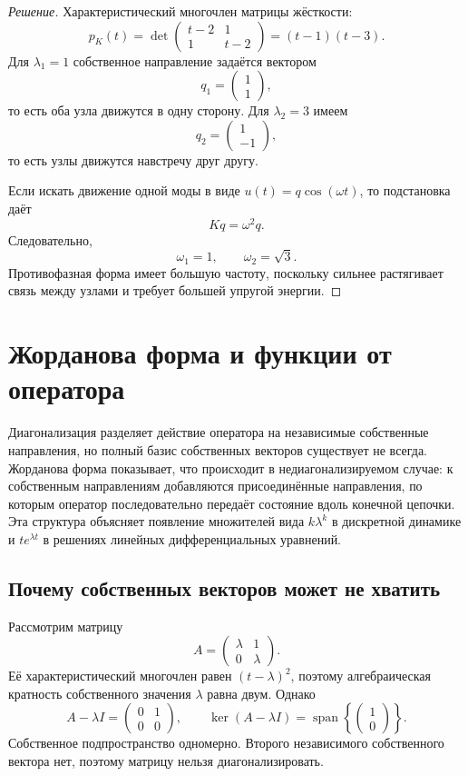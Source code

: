 \begin{proof}[Решение]
Характеристический многочлен матрицы жёсткости:
\[
p_K(t)=
\det
\begin{pmatrix}
t-2&1\\
1&t-2
\end{pmatrix}
=(t-1)(t-3).
\]
Для $\lambda_1=1$ собственное направление задаётся вектором
\[
q_1=
\begin{pmatrix}1\\1\end{pmatrix},
\]
то есть оба узла движутся в одну сторону. Для $\lambda_2=3$ имеем
\[
q_2=
\begin{pmatrix}1\\-1\end{pmatrix},
\]
то есть узлы движутся навстречу друг другу.

Если искать движение одной моды в виде $u(t)=q\cos(\omega t)$, то подстановка даёт
\[
Kq=\omega^2q.
\]
Следовательно,
\[
\omega_1=1,
\qquad
\omega_2=\sqrt3.
\]
Противофазная форма имеет большую частоту, поскольку сильнее растягивает связь между узлами и требует большей упругой энергии.
\end{proof}

\section{Жорданова форма и функции от оператора}
\label{sec:jordan-and-functions}

Диагонализация разделяет действие оператора на независимые собственные направления, но полный базис собственных векторов существует не всегда. Жорданова форма показывает, что происходит в недиагонализируемом случае: к собственным направлениям добавляются присоединённые направления, по которым оператор последовательно передаёт состояние вдоль конечной цепочки. Эта структура объясняет появление множителей вида $k\lambda^k$ в дискретной динамике и $t e^{\lambda t}$ в решениях линейных дифференциальных уравнений.

\subsection{Почему собственных векторов может не хватить}

Рассмотрим матрицу
\[
A=
\begin{pmatrix}
\lambda&1\\
0&\lambda
\end{pmatrix}.
\]
Её характеристический многочлен равен $(t-\lambda)^2$, поэтому алгебраическая кратность собственного значения $\lambda$ равна двум. Однако
\[
A-\lambda I=
\begin{pmatrix}
0&1\\
0&0
\end{pmatrix},
\qquad
\ker(A-\lambda I)
=
\operatorname{span}
\left
\{
\begin{pmatrix}1\\0\end{pmatrix}
\right\}.
\]
Собственное подпространство одномерно. Второго независимого собственного вектора нет, поэтому матрицу нельзя диагонализировать.

